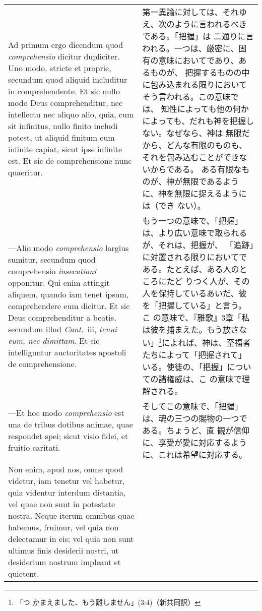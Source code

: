 \documentclass[10pt]{jsarticle} %
\begin{document}
\begin{longtable}{p{21em}p{21em}}
\\

{\sc Ad primum ergo dicendum} quod {\it comprehensio} dicitur
dupliciter. Uno modo, stricte et proprie, secundum quod aliquid
includitur in comprehendente. Et sic nullo modo Deus comprehenditur,
nec intellectu nec aliquo alio, quia, cum sit infinitus, nullo finito
includi potest, ut aliquid finitum eum infinite capiat, sicut ipse
infinite est. Et sic de comprehensione nunc quaeritur.

&

第一異論に対しては、それゆえ、次のように言われるべきである。「把握」は
二通りに言われる。一つは、厳密に、固有の意味においてであり、あるものが、
把握するものの中に包み込まれる限りにおいてそう言われる。この意味では、
知性によっても他の何かによっても、だれも神を把握しない。なぜなら、神は
無限だから、どんな有限のものも、それを包み込むことができないからである。
ある有限なものが、神が無限であるように、神を無限に捉えるようには（でき
ない）。

\\

---Alio modo {\it comprehensio} largius sumitur, secundum quod
comprehensio {\it insecutioni} opponitur. Qui enim attingit aliquem,
quando iam tenet ipsum, comprehendere eum dicitur. Et sic Deus
comprehenditur a beatis, secundum illud {\it Cant}.\ {\sc iii}, {\it
tenui eum, nec dimittam}. Et sic intelliguntur auctoritates apostoli
de comprehensione.

&

もう一つの意味で、「把握」は、より広い意味で取られるが、それは、把握が、
「追跡」に対置される限りにおいてである。たとえば、ある人のところにたど
りつく人が、その人を保持しているあいだ、彼を「把握している」と言う。こ
の意味で、『雅歌』3章「私は彼を捕まえた。もう放さない」\footnote{「つ
かまえました、もう離しません」(3:4)（新共同訳）}によれば、神は、至福者
たちによって「把握されて」いる。使徒の、「把握」についての諸権威は、こ
の意味で理解される。

\\

---Et hoc modo {\it comprehensio} est una de tribus dotibus animae,
quae respondet spei; sicut visio fidei, et fruitio caritati.

&

そしてこの意味で、「把握」は、魂の三つの賜物の一つである。ちょうど、直
観が信仰に、享受が愛に対応するように、これは希望に対応する。

\\

Non enim, apud nos, omne quod videtur, iam tenetur vel habetur, quia
videntur interdum distantia, vel quae non sunt in potestate
nostra. Neque iterum omnibus quae habemus, fruimur, vel quia non
delectamur in eis; vel quia non sunt ultimus finis desiderii nostri,
ut desiderium nostrum impleant et quietent.


\end{longtable}
\end{document}

